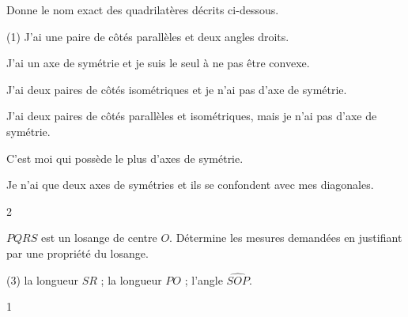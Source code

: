 \documentclass[a4paper,11pt]{report}
\begin{document}
\begin{exo}{
    Donne le nom exact des quadrilatères décrits ci-dessous.

    \begin{tasks}(1)        
        \task J'ai une paire de côtés parallèles et deux angles droits. %

        \task J'ai un axe de symétrie et je suis le seul à ne pas être convexe. %
        
        \task J'ai deux paires de côtés isométriques et je n'ai pas d'axe de symétrie. %

        \task J'ai deux paires de côtés parallèles et isométriques, mais je n'ai pas d'axe de symétrie. %

        \task C'est moi qui possède le plus d'axes de symétrie. %

        \task Je n'ai que deux axes de symétries et ils se confondent avec mes diagonales. %
    \end{tasks}
}{2}
\end{exo}


\begin{exo}{
    $PQRS$ est un losange de centre $O$. Détermine les mesures demandées en justifiant par une propriété du losange. \\
    \begin{center}
    \end{center}
    
    \begin{tasks}(3)
        \task la longueur $SR$ ;
        \task la longueur $PO$ ;
        \task l'angle $\widehat{SOP}$.
    \end{tasks}
}{1}
\end{exo}
\end{document}
